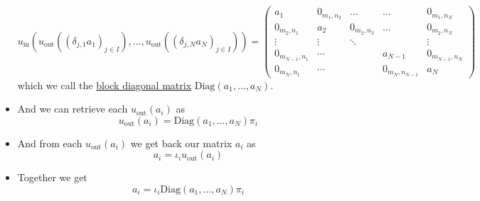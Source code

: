 \begin{example}
\begin{itemize}
\[
u_{\text{in}}(
u_{\text{out}}((\delta_{j,1}a_{1})_{j \in I}), \dots, u_{\text{out}}((\delta_{j,N}a_{N})_{j \in I})
) = \label{eq:u_in_u_out_block_diagonal}
\begin{pmatrix}
a_{1} & 0_{m_{1},n_{2}} & \dots & \dots & 0_{m_{1},n_{N}} \\
0_{m_{2},n_{1}} & a_{2} & 0_{m_{2},n_{3}} & \dots & 0_{m_{2},n_{N}} \\
\vdots & \vdots & \ddots & & \vdots \\
0_{m_{N-1},n_{1}} & \cdots &  & a_{N-1} & 0_{m_{N-1},n_{N}} \\
0_{m_{N},n_{1}} & \cdots & & 0_{m_{N},n_{N-1}} & a_{N}
\end{pmatrix}
\]
which we call the \ul{block diagonal matrix} $\mathrm{Diag}(a_{1},\dots,a_{N})$.
\item And we can retrieve each $u_{\text{out}}(a_{i})$ as
\[
u_{\text{out}}(a_{i}) = \mathrm{Diag}(a_{1},\dots,a_{N}) \pi_{i}
\]
\item And from each $u_{\text{out}}(a_{i})$ we get back our matrix $a_{i}$ as
\[
a_{i} = \iota_{i} u_{\text{out}}(a_{i})
\]
\item Together we get
\[
a_{i} = \iota_{i} \mathrm{Diag}(a_{1},\dots,a_{N}) \pi_{i}
\]
\end{itemize}
\end{example}

